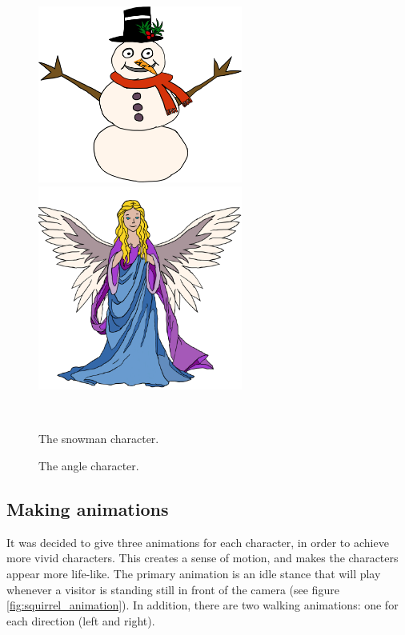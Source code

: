 \begin{figure}[htbp] \centering
\begin{minipage}[b]{0.45\textwidth} \centering
\includegraphics[width=0.60\textwidth]{Pictures/Design/snowman} %
\end{minipage} \hfill
\begin{minipage}[b]{0.45\textwidth} \centering
\includegraphics[width=0.60\textwidth]{Pictures/Design/Angel} %
\end{minipage} \\ %
\begin{minipage}[t]{0.45\textwidth}
\caption{The snowman character.} %
\label{fig:PixieGirl}
\end{minipage} \hfill
\begin{minipage}[t]{0.45\textwidth}
\caption{The angle character.} %
\label{fig:Angel}
\end{minipage}
\end{figure}

\subsection{Making animations} \label{sec:unity_ani}
It was decided to give three animations for each character, in order to achieve more vivid characters. This creates a sense of motion, and makes the characters appear more life-like. The primary animation is an idle stance that will play whenever a visitor is standing still in front of the camera (see figure \ref{fig:squirrel_animation}). In addition, there are two walking animations: one for each direction (left and right).

